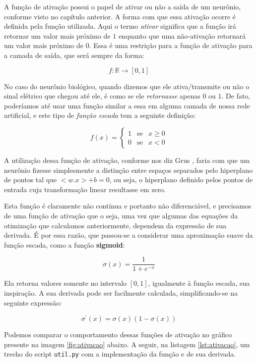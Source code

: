 A função de ativação possui o papel de ativar ou não a saída de um neurônio, conforme visto no capítulo anterior. A forma com que essa ativação ocorre é definida pela função utilizada. Aqui o termo \emph{ativar} significa que a função irá retornar um valor mais próximo de $1$ enquanto que uma não-ativação retornará um valor mais próximo de $0$. Essa é uma restrição para a função de ativação para a camada de saída, que será sempre da forma:

\[ f: \mathbb{R} \rightarrow [0, 1] \]

No caso do neurônio biológico, quando dizemos que ele ativa/transmite ou não o sinal elétrico que chegou até ele, é como se ele \emph{retornasse} apenas $0$ ou $1$. De fato, poderíamos até usar uma função similar a essa em alguma camada de nossa rede artificial, e este tipo de \emph{função escada} tem a seguinte definição:

\[
f(x) = 
\left\{
\begin{array}{lcr}
1 & \text{se} & x \geq 0\\
0 & \text{se} & x < 0
\end{array}
\right.
\]

A utilização dessa função de ativação, conforme nos diz Grus \citep{data}, faria com que um neurônio fizesse simplesmente a distinção entre espaços separados pelo hiperplano de pontos tal que $ <w.x> + b = 0$, ou seja, o hiperplano definido pelos pontos de entrada cuja transformação linear resultasse em zero.

Esta função é claramente não contínua e portanto não diferenciável, e precisamos de uma função de ativação que o seja, uma vez que algumas das equações da otimização que calculamos anteriormente, dependem da expressão de sua derivada. É por essa razão, que passou-se a considerar uma aproximação suave da função escada, como a função \textbf{sigmoid}:

\[
\sigma(x) = \frac{1}{1 + e^{-x}}
\]

Ela retorna valores somente no intervalo $[0, 1]$, igualmente à função escada, sua inspiração. A sua derivada pode ser facilmente calculada, simplificando-se na seguinte expressão:

\[
\sigma^{'}(x) = \sigma(x)(1-\sigma(x))
\]

Podemos comparar o comportamento dessas funções de ativação no gráfico presente na imagem \ref{fig:ativacao} abaixo. A seguir, na listagem \ref{lst:ativacao}, um trecho do script \texttt{util.py} com a implementação da função  e de sua derivada.

